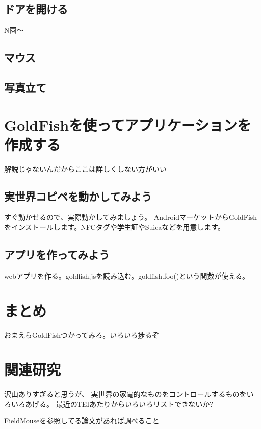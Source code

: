 \subsection{ドアを開ける}
N園〜

\subsection{マウス}

\subsection{写真立て}


\section{GoldFishを使ってアプリケーションを作成する}

解説じゃないんだからここは詳しくしない方がいい

\subsection{実世界コピペを動かしてみよう}
すぐ動かせるので、実際動かしてみましょう。
AndroidマーケットからGoldFishをインストールします。NFCタグや学生証やSuicaなどを用意します。

\subsection{アプリを作ってみよう}
webアプリを作る。goldfish.jsを読み込む。goldfish.foo()という関数が使える。

\section{まとめ}
おまえらGoldFishつかってみろ。いろいろ捗るぞ

\section{関連研究}

沢山ありすぎると思うが、
実世界の家電的なものをコントロールするものをいろいろあげる。
最近のTEIあたりからいろいろリストできないか?

FieldMouseを参照してる論文があれば調べること


